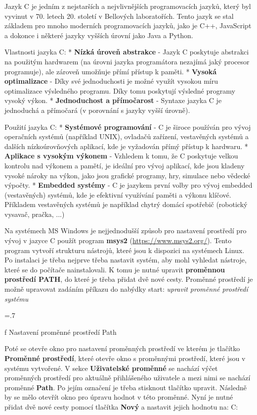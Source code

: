 Jazyk C je jedním z nejstarších a nejvlivnějších programovacích jazyků, který byl vyvinut v 70. letech 20. století v Bellových laboratořích. Tento jazyk se stal základem pro mnoho moderních programovacích jazyků, jako je C++, JavaScript a dokonce i některé jazyky vyšších úrovní jako Java a Python. 

Vlastnosti jazyka C:
\begitems
* {\bf Nízká úroveň abstrakce} - Jazyk C poskytuje abstrakci na použitým hardwarem (na úrovni jazyka programátora nezajímá jaký procesor programuje), ale zároveň umožňuje přímí přístup k paměti. 
* {\bf Vysoká optimalizace} - Díky své jednoduchosti je možné využít vysokou míru optimalizace výsledného programu. Díky tomu poskytují výsledné programy vysoký výkon.
* {\bf Jednoduchost a přímočarost} - Syntaxe jazyka C je jednoduchá a přímočará (v porovnání s jazyky vyšší úrovně). 
\enditems

Použití jazyka C:
\begitems
* {\bf Systémové programování} -  C je široce používán pro vývoj operačních systémů (například UNIX), ovladačů zařízení, vestavěných systémů a dalších nízkoúrovňových aplikací, kde je vyžadován přímý přístup k hardwaru.
* {\bf Aplikace s vysokým výkonem} - Vzhledem k tomu, že C poskytuje velkou kontrolu nad výkonem a pamětí, je ideální pro vývoj aplikací, kde jsou kladeny vysoké nároky na výkon, jako jsou grafické programy, hry, simulace nebo vědecké výpočty.
* {\bf Embedded systémy} - C je jazykem první volby pro vývoj embedded (vestavěných) systémů, kde je efektivní využívání paměti a výkonu klíčové. Příkladem vestavěných systémů je například chytrý domácí spotřebič (robotický vysavač, pračka, ...)
\enditems

Na systémech MS Windows je nejjednodušší způsob pro nastavení prostředí pro vývoj v jazyce C použít program {\bf msys2} (\url {https://www.msys2.org/}). Tento program vytvoří strukturu nástrojů, které jsou k dispozici na systémech Linux. Po instalaci je třeba nejprve třeba nastavit systém, aby mohl vyhledat nástroje, které se do počítače nainstalovali. K tomu je nutné upravit {\bf proměnnou prostředí PATH}, do které je třeba přidat dvě nové cesty. Proměnné prostředí je možně upravovat zadáním příkazu do nabýdky start: {\it upravit proměnné prostředí systému}

\vskip 5mm
\picw=.7\hsize \centerline{ }\nobreak\medskip
\caption/f Nastavení proměnné prostředí Path

Poté se otevře okno pro nastavení proměnných prostředí ve kterém je tlačítko {\bf Proměnné prostředí}, které otevře okno s proměnnými prostředí, které jsou v systému vytvořené. V sekce {\bf Uživatelské proměnné} se nachází výčet proměnných prostředí pro aktuálně přihlášeného uživatele a mezi nimi se nachází proměnné {\bf Path}. Po jejím označení je třeba stisknout tlačítko upravit. Následně by se mělo otevřít okno pro úpravu hodnot v této proměnné. Nyní je nutné přidat dvě nové cesty pomocí tlačítka {\bf Nový} a nastavit jejich hodnotu na: 
\begtt 
C:\usr\bin 
\endtt 
 

